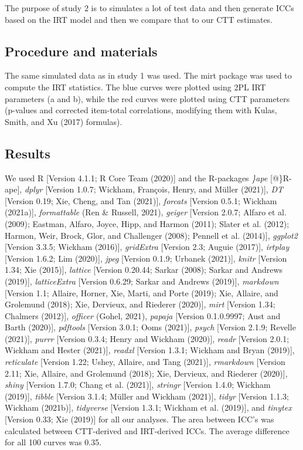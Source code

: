 \documentclass[
  english,
  man]{apa6}
\begin{document}
The purpose of study 2 is to simulates a lot of test data and then generate ICCs based on the IRT model and then we compare that to our CTT estimates.

\hypertarget{procedure-and-materials}{%
\subsection{Procedure and materials}\label{procedure-and-materials}}

The same simulated data as in study 1 was used. The mirt package was used to compute the IRT statistics. The blue curves were plotted using 2PL IRT parameters (a and b), while the red curves were plotted using CTT parameters (p-values and corrected item-total correlations, modifying them with Kulas, Smith, and Xu (2017) formulas).

\hypertarget{results-1}{%
\subsection{Results}\label{results-1}}

We used R {[}Version 4.1.1; R Core Team (2020){]} and the R-packages \emph{\}ape} {[}@\}R-ape{]}, \emph{dplyr} {[}Version 1.0.7; Wickham, François, Henry, and Müller (2021){]}, \emph{DT} {[}Version 0.19; Xie, Cheng, and Tan (2021){]}, \emph{forcats} {[}Version 0.5.1; Wickham (2021a){]}, \emph{formattable} (Ren \& Russell, 2021), \emph{geiger} {[}Version 2.0.7; Alfaro et al. (2009); Eastman, Alfaro, Joyce, Hipp, and Harmon (2011); Slater et al. (2012); Harmon, Weir, Brock, Glor, and Challenger (2008); Pennell et al. (2014){]}, \emph{ggplot2} {[}Version 3.3.5; Wickham (2016){]}, \emph{gridExtra} {[}Version 2.3; Auguie (2017){]}, \emph{irtplay} {[}Version 1.6.2; Lim (2020){]}, \emph{jpeg} {[}Version 0.1.9; Urbanek (2021){]}, \emph{knitr} {[}Version 1.34; Xie (2015){]}, \emph{lattice} {[}Version 0.20.44; Sarkar (2008); Sarkar and Andrews (2019){]}, \emph{latticeExtra} {[}Version 0.6.29; Sarkar and Andrews (2019){]}, \emph{markdown} {[}Version 1.1; Allaire, Horner, Xie, Marti, and Porte (2019); Xie, Allaire, and Grolemund (2018); Xie, Dervieux, and Riederer (2020){]}, \emph{mirt} {[}Version 1.34; Chalmers (2012){]}, \emph{officer} (Gohel, 2021), \emph{papaja} {[}Version 0.1.0.9997; Aust and Barth (2020){]}, \emph{pdftools} {[}Version 3.0.1; Ooms (2021){]}, \emph{psych} {[}Version 2.1.9; Revelle (2021){]}, \emph{purrr} {[}Version 0.3.4; Henry and Wickham (2020){]}, \emph{readr} {[}Version 2.0.1; Wickham and Hester (2021){]}, \emph{readxl} {[}Version 1.3.1; Wickham and Bryan (2019){]}, \emph{reticulate} {[}Version 1.22; Ushey, Allaire, and Tang (2021){]}, \emph{rmarkdown} {[}Version 2.11; Xie, Allaire, and Grolemund (2018); Xie, Dervieux, and Riederer (2020){]}, \emph{shiny} {[}Version 1.7.0; Chang et al. (2021){]}, \emph{stringr} {[}Version 1.4.0; Wickham (2019){]}, \emph{tibble} {[}Version 3.1.4; Müller and Wickham (2021){]}, \emph{tidyr} {[}Version 1.1.3; Wickham (2021b){]}, \emph{tidyverse} {[}Version 1.3.1; Wickham et al. (2019){]}, and \emph{tinytex} {[}Version 0.33; Xie (2019){]} for all our analyses. The area between ICC's was calculated between CTT-derived and IRT-derived ICCs. The average difference for all 100 curves was 0.35.
\end{document}
